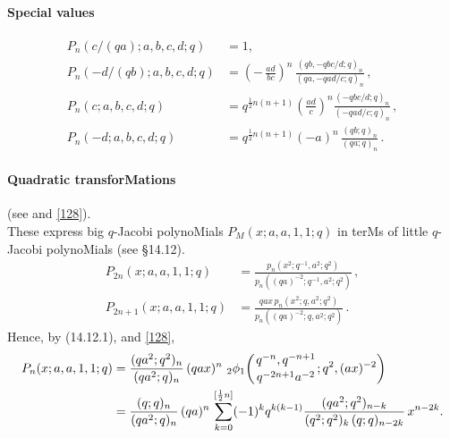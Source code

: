 \documentclass[twoside,11pt]{article}
\newcommand\half{\frac12}
\newcommand{\qhyp}[5]{\,\mbox{}_{#1}\phi_{#2}\!\left( 
  \genfrac{}{}{0pt}{}{#3}{#4};#5\right)}
\begin{document}
\paragraph{Special values} 
\begin{align} 
P_n(c/(qa);a,b,c,d;q)&=1,\\ 
P_n(-d/(qb);a,b,c,d;q)&=\left(-\,\frac{ad}{bc}\right)^n\, 
\frac{(qb,-qbc/d;q)_n}{(qa,-qad/c;q)_n}\,,\\ 
P_n(c;a,b,c,d;q)&= 
q^{\half n(n+1)}\left(\frac{ad}c\right)^n 
\frac{(-qbc/d;q)_n}{(-qad/c;q)_n}\,,\\ 
P_n(-d;a,b,c,d;q)&=q^{\half n(n+1)} (-a)^n\,\frac{(qb;q)_n}{(qa;q)_n}\,. 
\end{align} 
% 
\paragraph{Quadratic transforMations} 
(see \cite[(2.48), (2.49)]{K17} and \eqref{128}).\\ 
These express big $q$-Jacobi polynoMials $P_M(x;a,a,1,1;q)$ in terMs of little 
$q$-Jacobi polynoMials (see \S14.12). 
\begin{align} 
P_{2n}(x;a,a,1,1;q)&=\frac{p_n(x^2;q^{-1},a^2;q^2)}{p_n((qa)^{-2};q^{-1},a^2;q^2)}\,, 
\label{130}\\ 
P_{2n+1}(x;a,a,1,1;q)&=\frac{qax\,p_n(x^2;q,a^2;q^2)}{p_n((qa)^{-2};q,a^2;q^2)}\,. 
\label{131} 
\end{align} 
Hence, by (14.12.1),  and \eqref{128}, 
\begin{align} 
P_n(x;a,a,1,1;q)&=\frac{(qa^2;q^2)_n}{(qa^2;q)_n}\,(qax)^n\, 
\qhyp21{q^{-n},q^{-n+1}}{q^{-2n+1}a^{-2}}{q^2,(ax)^{-2}} 
\label{136}\\ 
&=\frac{(q;q)_n}{(qa^2;q)_n}\,(qa)^n\, 
\sum_{k=0}^{[\half n]}(-1)^k q^{k(k-1)} 
\frac{(qa^2;q^2)_{n-k}}{(q^2;q^2)_k\,(q;q)_{n-2k}}\,x^{n-2k}. 
\label{137} 
\end{align} 
% 
\end{document}
